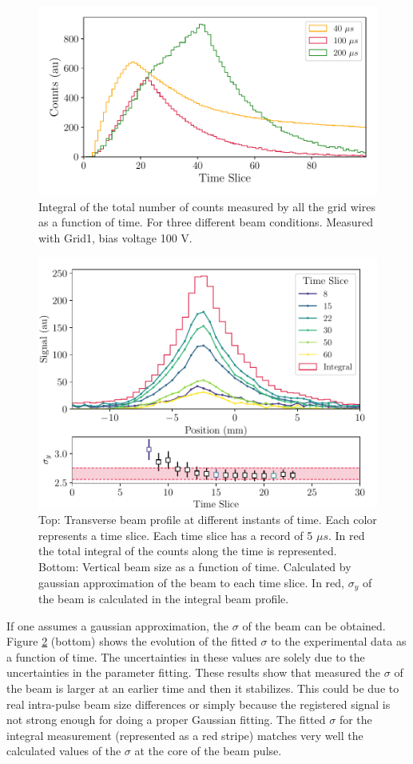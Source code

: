 \begin{figure}[h]
    \vspace{-0.2cm}
    \centering
    \includegraphics[width=0.8\columnwidth]{TimeEvolProj/TimeEvolutionProj.pdf}
    \caption{Integral of the total number of counts measured by all the grid wires as a function of time. For three different beam conditions. Measured with Grid1, bias voltage 100 V. }
    \label{fig:TimeDepProje}
\end{figure}
\vspace{-0.5cm}
\begin{figure}[h!]
    \centering
    \includegraphics[width=0.8\columnwidth]{BeamProfileWithTime/BeamSigmaWithTime.pdf}
    \caption{Top: Transverse beam profile at different instants of time. Each color represents a time slice. Each time slice has a record of 5 $\mu s$. In red the total integral of the counts along the time is represented. Bottom: Vertical beam size as a function of time. Calculated by gaussian approximation of the beam to each time slice. In red, $\sigma_y$ of the beam is calculated in the integral beam profile. }
    \label{fig:SigmaEvolutionTime}
\end{figure}

If one assumes a gaussian approximation, the $\sigma$ of the beam can be obtained. Figure \ref{fig:SigmaEvolutionTime} (bottom) shows the evolution of the fitted $\sigma$ to the experimental data as a function of time. The uncertainties in these values are solely due to the uncertainties in the parameter fitting. These results show that measured the $\sigma$ of the beam is larger at an earlier time and then it stabilizes. This could be due to real intra-pulse beam size differences or simply because the registered signal is not strong enough for doing a proper Gaussian fitting. The fitted $\sigma$ for the integral measurement (represented as a red stripe) matches very well the calculated values of the $\sigma$ at the core of the beam pulse. 

